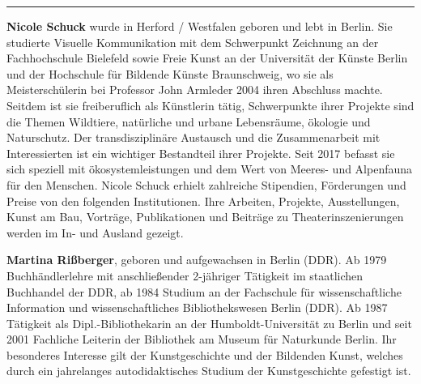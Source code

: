 \documentclass[a4paper,
fontsize=11pt,
oneside,
numbers=noperiodatend,
parskip=half-,
bibliography=totoc,
final
]{scrartcl}
\begin{document}
\begin{center}\rule{0.5\linewidth}{0.5pt}\end{center}

\textbf{Nicole Schuck} wurde in Herford / Westfalen geboren und lebt in
Berlin. Sie studierte Visuelle Kommunikation mit dem Schwerpunkt
Zeichnung an der Fachhochschule Bielefeld sowie Freie Kunst an der
Universität der Künste Berlin und der Hochschule für Bildende Künste
Braunschweig, wo sie als Meisterschülerin bei Professor John Armleder
2004 ihren Abschluss machte. Seitdem ist sie freiberuflich als
Künstlerin tätig, Schwerpunkte ihrer Projekte sind die Themen Wildtiere,
natürliche und urbane Lebensräume, ökologie und Naturschutz. Der
transdisziplinäre Austausch und die Zusammenarbeit mit Interessierten
ist ein wichtiger Bestandteil ihrer Projekte. Seit 2017 befasst sie sich
speziell mit ökosystemleistungen und dem Wert von Meeres- und Alpenfauna
für den Menschen. Nicole Schuck erhielt zahlreiche Stipendien,
Förderungen und Preise von den folgenden Institutionen. Ihre Arbeiten,
Projekte, Ausstellungen, Kunst am Bau, Vorträge, Publikationen und
Beiträge zu Theaterinszenierungen werden im In- und Ausland gezeigt.

\textbf{Martina Rißberger}, geboren und aufgewachsen in Berlin (DDR). Ab
1979 Buchhändlerlehre mit anschließender 2-jähriger Tätigkeit im
staatlichen Buchhandel der DDR, ab 1984 Studium an der Fachschule für
wissenschaftliche Information und wissenschaftliches Bibliothekswesen
Berlin (DDR). Ab 1987 Tätigkeit als Dipl.-Bibliothekarin an der
Humboldt-Universität zu Berlin und seit 2001 Fachliche Leiterin der
Bibliothek am Museum für Naturkunde Berlin. Ihr besonderes Interesse
gilt der Kunstgeschichte und der Bildenden Kunst, welches durch ein
jahrelanges autodidaktisches Studium der Kunstgeschichte gefestigt ist.
\end{document}
